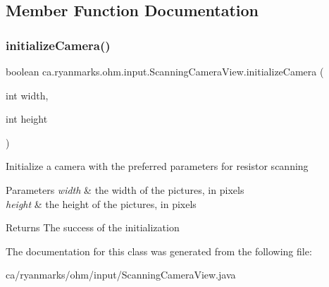 \subsection{Member Function Documentation}
\hypertarget{classca_1_1ryanmarks_1_1ohm_1_1input_1_1_scanning_camera_view_a6a040425f2dd892fd5b81767203b405c}{}\label{classca_1_1ryanmarks_1_1ohm_1_1input_1_1_scanning_camera_view_a6a040425f2dd892fd5b81767203b405c} 
\subsubsection{\texorpdfstring{initialize\+Camera()}{initializeCamera()}}
{\footnotesize\ttfamily boolean ca.\+ryanmarks.\+ohm.\+input.\+Scanning\+Camera\+View.\+initialize\+Camera (\begin{DoxyParamCaption}\item[{int}]{width,  }\item[{int}]{height }\end{DoxyParamCaption})\hspace{0.3cm}{\ttfamily [protected]}}

Initialize a camera with the preferred parameters for resistor scanning 
\begin{DoxyParams}{Parameters}
{\em width} & the width of the pictures, in pixels \\
\hline
{\em height} & the height of the pictures, in pixels \\
\hline
\end{DoxyParams}
\begin{DoxyReturn}{Returns}
The success of the initialization 
\end{DoxyReturn}


The documentation for this class was generated from the following file\+:\begin{DoxyCompactItemize}
\item 
ca/ryanmarks/ohm/input/Scanning\+Camera\+View.\+java\end{DoxyCompactItemize}
